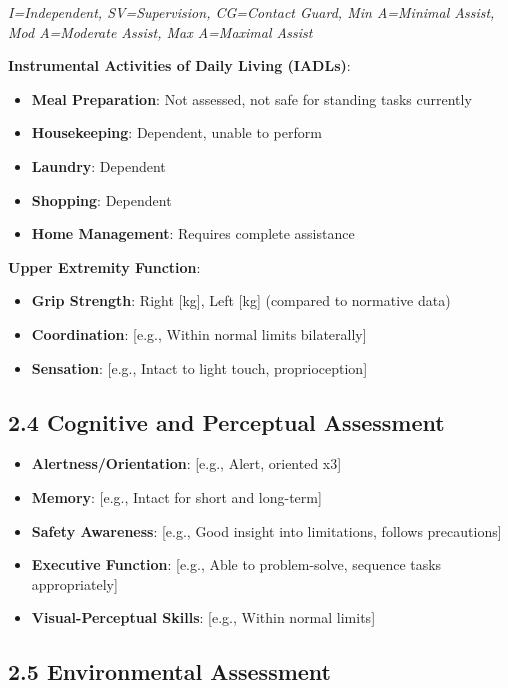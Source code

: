 \documentclass[11pt,letterpaper]{article}
\begin{document}
\textit{I=Independent, SV=Supervision, CG=Contact Guard, Min A=Minimal Assist, Mod A=Moderate Assist, Max A=Maximal Assist}

\textbf{Instrumental Activities of Daily Living (IADLs)}:
\begin{itemize}[leftmargin=*]
    \item \textbf{Meal Preparation}: Not assessed, not safe for standing tasks currently
    \item \textbf{Housekeeping}: Dependent, unable to perform
    \item \textbf{Laundry}: Dependent
    \item \textbf{Shopping}: Dependent
    \item \textbf{Home Management}: Requires complete assistance
\end{itemize}

\textbf{Upper Extremity Function}:
\begin{itemize}[leftmargin=*]
    \item \textbf{Grip Strength}: Right [kg], Left [kg] (compared to normative data)
    \item \textbf{Coordination}: [e.g., Within normal limits bilaterally]
    \item \textbf{Sensation}: [e.g., Intact to light touch, proprioception]
\end{itemize}

\subsection*{2.4 Cognitive and Perceptual Assessment}

\begin{itemize}[leftmargin=*]
    \item \textbf{Alertness/Orientation}: [e.g., Alert, oriented x3]
    \item \textbf{Memory}: [e.g., Intact for short and long-term]
    \item \textbf{Safety Awareness}: [e.g., Good insight into limitations, follows precautions]
    \item \textbf{Executive Function}: [e.g., Able to problem-solve, sequence tasks appropriately]
    \item \textbf{Visual-Perceptual Skills}: [e.g., Within normal limits]
\end{itemize}

\subsection*{2.5 Environmental Assessment}
\end{document}

